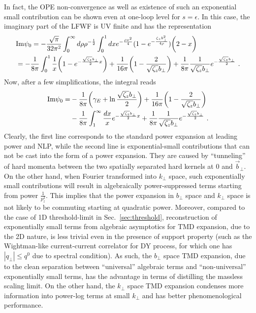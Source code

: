 \documentclass[a4paper,11pt]{article}
\begin{document}
In fact, the OPE non-convergence as well as existence of such an exponential small contribution can be shown even at one-loop level for $s=\epsilon$. In this case, the imaginary part of the LFWF is UV
finite and has the representation
\begin{align}\label{eq:Imf0}
&{\rm Im}\psi_0
=-\frac{\sqrt{\pi}}{32\pi^2}\int_{0}^{\infty} d\rho \rho^{-\frac{1}{2}}\int_0^1dx e^{-\frac{\rho x^2}{4}} (1-e^{-\frac{\zeta_zb_\perp^2}{4\rho}})\bigg(2-x\bigg)  \nonumber \\ 
&=-\frac{1}{8\pi}\int_{0}^1\frac{1}{x}\bigg(1-e^{-\frac{\sqrt{\zeta_z}b_\perp}{2}x}\bigg)+\frac{1}{16\pi}\bigg(1-\frac{2}{\sqrt{\zeta_z}b_\perp}\bigg)+\frac{1}{8\pi}\frac{1}{\sqrt{\zeta_z}b_\perp}e^{-\frac{\sqrt{\zeta_z}b_\perp}{2}}\ .
\end{align}
Now, after a few simplifications, the integral reads
\begin{align}
{\rm Im}\psi_0=&-\frac{1}{8\pi}\bigg(\gamma_E+\ln \frac{\sqrt{\zeta_z}b_\perp}{2}\bigg)+\frac{1}{16\pi}\bigg(1-\frac{2}{\sqrt{\zeta_z}b_\perp}\bigg) \nonumber \\ 
&-\frac{1}{8\pi}\int_{1}^{\infty}\frac{dx}{x}e^{-\frac{\sqrt{\zeta_z}b_\perp}{2}x}+\frac{1}{8\pi}\frac{1}{\sqrt{\zeta_z}b_\perp}e^{-\frac{\sqrt{\zeta_z}b_\perp}{2}} \ .
\end{align}
Clearly, the first line corresponds to the standard power expansion at leading power and NLP, while the second line is exponential-small contributions that can not be cast into the form of a power expansion. They are caused by ``tunneling'' of hard momenta 
between the two spatially separated hard kernels at $0$ and $\vec{b}_\perp$. On the other hand, when Fourier transformed into $k_\perp$ space,  such exponentially small contributions will result in algebraically power-suppressed terms starting from power $\frac{1}{p_z^2}$. This implies that the power expansion in $b_\perp $ space and $k_\perp$ space is not likely to be commuting starting at quadratic power. Moreover, compared to the case of 1D threshold-limit in Sec.~\ref{sec:threshold}, 
reconstruction of exponentially small terms from algebraic asymptotics for TMD expansion, due to the 2D nature, is less trivial even in the presence of support property (such as the Wightman-like current-current correlator for DY process, for which one has $|q_\perp| \le q^0$ due to spectral condition).  As such,  the $b_\perp$ space TMD expansion,  due to the clean separation between ``universal'' algebraic terms and ``non-universal'' exponentially small terms,  has the advantage in terms of distilling the massless scaling limit. On the other hand, the $k_\perp$ space TMD expansion condenses more information into power-log terms at small $k_\perp$ and has better phenomenological performance. 
\end{document}
